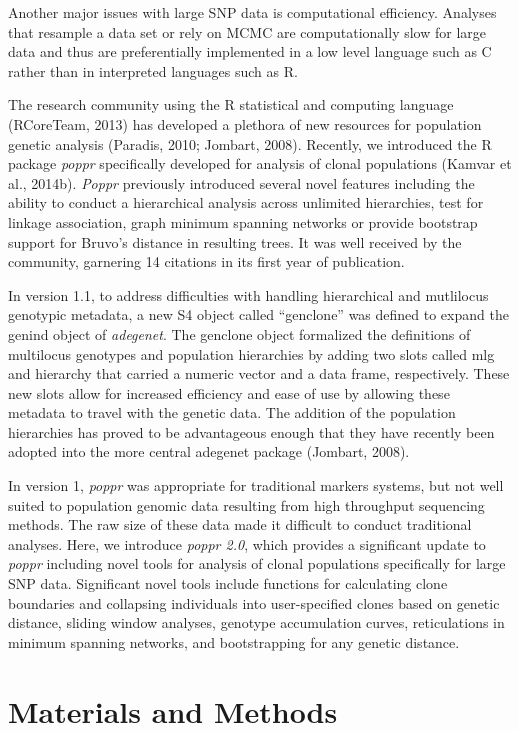 \documentclass{frontiersSCNS} %
\begin{document}
Another major issues with large SNP data is computational efficiency.
Analyses that resample a data set or rely on MCMC are computationally
slow for large data and thus are preferentially implemented in a low
level language such as C rather than in interpreted languages such as R.

The research community using the R statistical and computing language
(RCoreTeam, 2013) has developed a plethora of new resources for
population genetic analysis (Paradis, 2010; Jombart, 2008). Recently, we
introduced the R package \emph{poppr} specifically developed for
analysis of clonal populations (Kamvar et al., 2014b). \emph{Poppr}
previously introduced several novel features including the ability to
conduct a hierarchical analysis across unlimited hierarchies, test for
linkage association, graph minimum spanning networks or provide
bootstrap support for Bruvo's distance in resulting trees. It was well
received by the community, garnering 14 citations in its first year of
publication.

In version 1.1, to address difficulties with handling hierarchical and
mutlilocus genotypic metadata, a new S4 object called ``genclone'' was
defined to expand the genind object of \emph{adegenet}. The genclone
object formalized the definitions of multilocus genotypes and population
hierarchies by adding two slots called mlg and hierarchy that carried a
numeric vector and a data frame, respectively. These new slots allow for
increased efficiency and ease of use by allowing these metadata to
travel with the genetic data. The addition of the population hierarchies
has proved to be advantageous enough that they have recently been
adopted into the more central adegenet package (Jombart, 2008).

In version 1, \emph{poppr} was appropriate for traditional markers
systems, but not well suited to population genomic data resulting from
high throughput sequencing methods. The raw size of these data made it
difficult to conduct traditional analyses. Here, we introduce
\emph{poppr 2.0}, which provides a significant update to \emph{poppr}
including novel tools for analysis of clonal populations specifically
for large SNP data. Significant novel tools include functions for
calculating clone boundaries and collapsing individuals into
user-specified clones based on genetic distance, sliding window
analyses, genotype accumulation curves, reticulations in minimum
spanning networks, and bootstrapping for any genetic distance.

\section*{Materials and Methods}\label{materials-and-methods}
\end{document}
